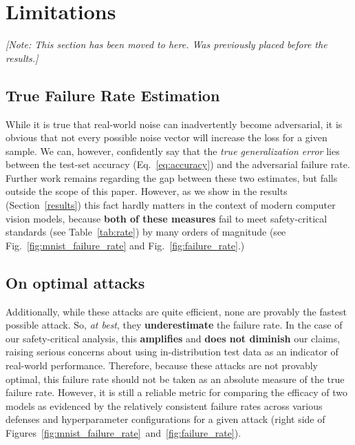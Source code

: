 \documentclass[journal]{IEEEtran}
\newcommand{\ie}{\textit{i.e.}\xspace}
\newcommand{\cm}[1]{\textit{{\color{blue}#1}}}
\begin{document}
\section{Limitations}
\cm{[Note: This section has been moved to here. Was previously placed before the results.]}
\label{limitations}
\subsection{True Failure Rate Estimation} 
While it is true that real-world noise can inadvertently become adversarial, it is obvious that not every possible noise vector will increase the loss for a given sample. We can, however, confidently say that the \textit{true generalization error} lies between the test-set accuracy (Eq.~\ref{eq:accuracy}) and the adversarial failure rate. Further work remains regarding the gap between these two estimates, but falls outside the scope of this paper. However, as we show in the results (Section~\ref{results}) this fact hardly matters in the context of modern computer vision models, because \textbf{both of these measures} fail to meet safety-critical standards (see Table~\ref{tab:rate}) by many orders of magnitude (see Fig.~\ref{fig:mnist_failure_rate} and Fig.~\ref{fig:failure_rate}.) 



\subsection{On optimal attacks}
Additionally, while these attacks are quite efficient, none are provably the fastest possible attack. So, \textit{at best}, they \textbf{underestimate} the failure rate. In the case of our safety-critical analysis, this \textbf{amplifies} and \textbf{does not diminish} our claims, raising serious concerns about using in-distribution test data as an indicator of real-world performance. Therefore, because these attacks are not provably optimal, this failure rate should not be taken as an absolute measure of the true failure rate. However, it is still a reliable metric for comparing the efficacy of two models as evidenced by the relatively consistent failure rates across various defenses and hyperparameter configurations for a given attack (right side of Figures~\ref{fig:mnist_failure_rate}~and~\ref{fig:failure_rate}). 
\end{document}
